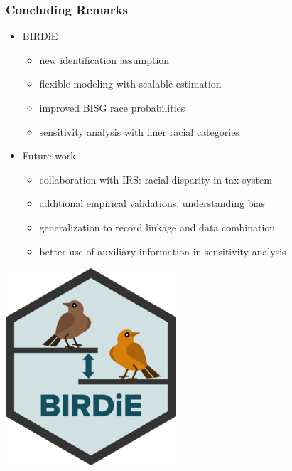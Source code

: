 \documentclass{beamer}
\begin{document}
\begin{frame}

  \frametitle{Concluding Remarks}

  \begin{itemize}
  \item BIRDiE
    \begin{itemize}
    \item new identification assumption
    \item flexible modeling with scalable estimation
    \item improved BISG race probabilities
    \item sensitivity analysis with finer racial categories
    \end{itemize}
    \vfill

  \item Future work
    \begin{itemize}
    \item collaboration with IRS: racial disparity in tax system
    \item additional empirical validations: understanding bias
    \item generalization to record linkage and data combination
    \item better use of auxiliary information in sensitivity analysis
    \end{itemize}
  \end{itemize}

  \vfill
  \vspace{-.7in}
  \begin{flushright}
     \includegraphics[scale=0.165]{../man/figures/logo.png}
  \end{flushright}
\end{frame}
\end{document}

